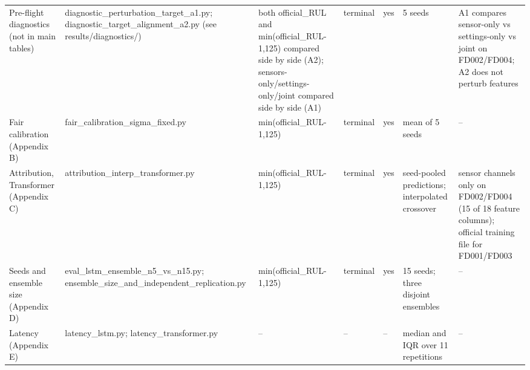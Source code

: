 \documentclass[10pt,a4paper]{article}
\begin{document}
\begin{center}
\begin{longtable}{p{2.0cm}p{3.8cm}p{1.4cm}p{1.4cm}p{0.9cm}p{2.2cm}p{1.2cm}}
Pre-flight diagnostics (not in main tables) & diagnostic\_\allowbreak perturbation\_\allowbreak target\_\allowbreak a1\allowbreak .py; diagnostic\_\allowbreak target\_\allowbreak alignment\_\allowbreak a2\allowbreak .py (see results/diagnostics/) & both official\_\allowbreak RUL and min(official\_\allowbreak RUL-1,125) compared side by side (A2); sensors-only/settings-only/joint compared side by side (A1) & terminal & yes & 5 seeds & A1 compares sensor-only vs settings-only vs joint on FD002/FD004; A2 does not perturb features \\
Fair calibration (Appendix B) & fair\_\allowbreak calibration\_\allowbreak sigma\_\allowbreak fixed\allowbreak .py & min(official\_\allowbreak RUL-1,125) & terminal & yes & mean of 5 seeds & -- \\
Attribution, Transformer (Appendix C) & attribution\_\allowbreak interp\_\allowbreak transformer\allowbreak .py & min(official\_\allowbreak RUL-1,125) & terminal & yes & seed-pooled predictions; interpolated crossover & sensor channels only on FD002/FD004 (15 of 18 feature columns); official training file for FD001/FD003 \\
Seeds and ensemble size (Appendix D) & eval\_\allowbreak lstm\_\allowbreak ensemble\_\allowbreak n5\_\allowbreak vs\_\allowbreak n15\allowbreak .py; ensemble\_\allowbreak size\_\allowbreak and\_\allowbreak independent\_\allowbreak replication\allowbreak .py & min(official\_\allowbreak RUL-1,125) & terminal & yes & 15 seeds; three disjoint ensembles & -- \\
Latency (Appendix E) & latency\_\allowbreak lstm\allowbreak .py; latency\_\allowbreak transformer\allowbreak .py & -- & -- & -- & median and IQR over 11 repetitions & -- \\
\bottomrule
\end{longtable}
\end{center}
\end{document}
